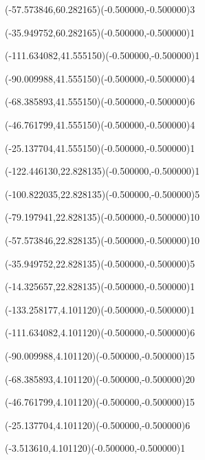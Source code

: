 \ASYalign(-57.573846,60.282165)(-0.500000,-0.500000){3}%
%
%
\fontsize{9.000000}{10.800000}\selectfont%
\ASYalign(-35.949752,60.282165)(-0.500000,-0.500000){1}%
%
%
\fontsize{9.000000}{10.800000}\selectfont%
\ASYalign(-111.634082,41.555150)(-0.500000,-0.500000){1}%
%
%
\fontsize{9.000000}{10.800000}\selectfont%
\ASYalign(-90.009988,41.555150)(-0.500000,-0.500000){4}%
%
%
\fontsize{9.000000}{10.800000}\selectfont%
\ASYalign(-68.385893,41.555150)(-0.500000,-0.500000){6}%
%
%
\fontsize{9.000000}{10.800000}\selectfont%
\ASYalign(-46.761799,41.555150)(-0.500000,-0.500000){4}%
%
%
\fontsize{9.000000}{10.800000}\selectfont%
\ASYalign(-25.137704,41.555150)(-0.500000,-0.500000){1}%
%
%
\fontsize{9.000000}{10.800000}\selectfont%
\ASYalign(-122.446130,22.828135)(-0.500000,-0.500000){1}%
%
%
\fontsize{9.000000}{10.800000}\selectfont%
\ASYalign(-100.822035,22.828135)(-0.500000,-0.500000){5}%
%
%
\fontsize{9.000000}{10.800000}\selectfont%
\ASYalign(-79.197941,22.828135)(-0.500000,-0.500000){10}%
%
%
\fontsize{9.000000}{10.800000}\selectfont%
\ASYalign(-57.573846,22.828135)(-0.500000,-0.500000){10}%
%
%
\fontsize{9.000000}{10.800000}\selectfont%
\ASYalign(-35.949752,22.828135)(-0.500000,-0.500000){5}%
%
%
\fontsize{9.000000}{10.800000}\selectfont%
\ASYalign(-14.325657,22.828135)(-0.500000,-0.500000){1}%
%
%
\fontsize{9.000000}{10.800000}\selectfont%
\ASYalign(-133.258177,4.101120)(-0.500000,-0.500000){1}%
%
%
\fontsize{9.000000}{10.800000}\selectfont%
\ASYalign(-111.634082,4.101120)(-0.500000,-0.500000){6}%
%
%
\fontsize{9.000000}{10.800000}\selectfont%
\ASYalign(-90.009988,4.101120)(-0.500000,-0.500000){15}%
%
%
\fontsize{9.000000}{10.800000}\selectfont%
\ASYalign(-68.385893,4.101120)(-0.500000,-0.500000){20}%
%
%
\fontsize{9.000000}{10.800000}\selectfont%
\ASYalign(-46.761799,4.101120)(-0.500000,-0.500000){15}%
%
%
\fontsize{9.000000}{10.800000}\selectfont%
\ASYalign(-25.137704,4.101120)(-0.500000,-0.500000){6}%
%
%
\fontsize{9.000000}{10.800000}\selectfont%
\ASYalign(-3.513610,4.101120)(-0.500000,-0.500000){1}%
